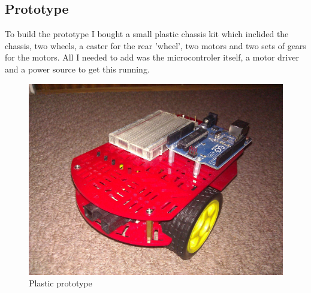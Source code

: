 \documentclass[11pt,fleqn,twoside]{article}
\begin{document}
\subsection{Prototype}
To build the prototype I bought a small plastic chassis kit which inclided the chassis, two wheels, a caster for the rear 'wheel', two motors and two sets of gears for the motors.  All I needed to add was the microcontroler itself, a motor driver and a power source to get this running.
\begin{figure}[h]
\centering
        \includegraphics[width=5.0in] {figures/tria-mkI.jpg}
        \caption{Plastic prototype}
        \label{Plastic prototype}
\end{figure}
\end{document}
